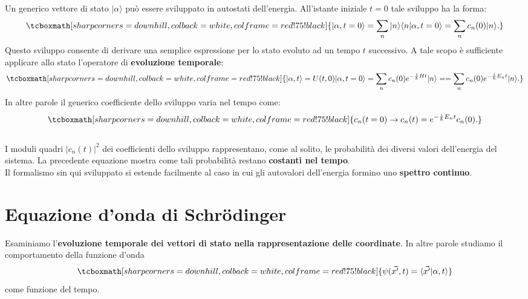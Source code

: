 Un generico vettore di stato $\vert \alpha \rangle $ può essere sviluppato in autostati dell'energia. All'istante iniziale $t=0$ tale sviluppo ha la forma:
	\begin{equation}
		\tcboxmath[sharp corners=downhill, colback=white, colframe=red!75!black]{
			\vert \alpha , t=0\rangle = \sum _n \vert n \rangle \langle n \vert \alpha, t=0 \rangle = \sum _n c_n(0)\vert n \rangle.
			}
	\end{equation}
Questo sviluppo consente di derivare una semplice espressione per lo stato evoluto ad un tempo $t$ successivo. A tale scopo è sufficiente applicare allo stato l'operatore di \textbf{evoluzione temporale}:
	\begin{equation}
		\tcboxmath[sharp corners=downhill, colback=white, colframe=red!75!black]{
			\vert \alpha, t \rangle = U (t,0)\vert \alpha, t=0 \rangle = \sum _n c_n (0) e^{-\frac{i}{\hbar}H t}  \vert n \rangle =  =\sum _n c_n (0) e^{-\frac{i}{\hbar}E_n t}  \vert n \rangle.
			}
	\end{equation}
In altre parole il generico coefficiente dello sviluppo varia nel tempo come:
	\begin{equation}
		\tcboxmath[sharp corners=downhill, colback=white, colframe=red!75!black]{
			c_n (t=0) \rightarrow c_n(t)=e^{-\frac{i}{\hbar}E_n t} c_n (0).
			}
	\end{equation}\\
	
I moduli quadri $\vert c_n(t)\vert^2$ dei coefficienti dello sviluppo rappresentano, come al solito, le probabilità dei diversi valori dell'energia del sistema. La precedente equazione mostra come tali probabilità restano \textbf{costanti nel tempo}.\\

Il formalismo sin qui sviluppato si estende facilmente al caso in cui gli autovalori dell'energia formino uno \textbf{spettro continuo}.
\section[ Equazione d'onda di Schrödinger]{Equazione d'onda di Schr\"{o}dinger}
Esaminiamo l'\textbf{evoluzione temporale dei vettori di stato nella rappresentazione delle coordinate}. In altre parole studiamo il comportamento della funzione d'onda
	\begin{equation}
		\tcboxmath[sharp corners=downhill, colback=white, colframe=red!75!black]{
		\psi (\vec{x'}, t) = \langle \vec{x'}\vert \alpha, t \rangle
		}
	\end{equation}
come funzione del tempo.\\


